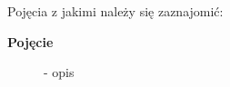 	Pojęcia z jakimi należy się zaznajomić:
	\begin{description}
	
		\item[\textbf{Pojęcie}] - opis

	\end{description}
